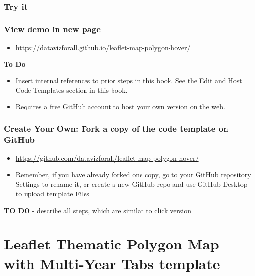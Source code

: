 \documentclass[
  english,
]{book}
\providecommand{\tightlist}{%
  \setlength{\itemsep}{0pt}\setlength{\parskip}{0pt}}
\begin{document}
\hypertarget{try-it-12}{%
\subsubsection*{Try it}\label{try-it-12}}

\hypertarget{view-demo-in-new-page-1}{%
\subsubsection*{View demo in new page}\label{view-demo-in-new-page-1}}

\begin{itemize}
\tightlist
\item
  \url{https://datavizforall.github.io/leaflet-map-polygon-hover/}
\end{itemize}

\textbf{To Do}

\begin{itemize}
\tightlist
\item
  Insert internal references to prior steps in this book. See the Edit and Host Code Templates section in this book.
\item
  Requires a free GitHub account to host your own version on the web.
\end{itemize}

\hypertarget{create-your-own-fork-a-copy-of-the-code-template-on-github-1}{%
\subsubsection*{Create Your Own: Fork a copy of the code template on GitHub}\label{create-your-own-fork-a-copy-of-the-code-template-on-github-1}}

\begin{itemize}
\tightlist
\item
  \url{https://github.com/datavizforall/leaflet-map-polygon-hover/}
\item
  Remember, if you have already forked one copy, go to your GitHub repository Settings to rename it, or create a new GitHub repo and use GitHub Desktop to upload template Files
\end{itemize}

\textbf{TO DO}
- describe all steps, which are similar to click version

\hypertarget{leaflet-polygon-map-multi-year-tabs}{%
\section{Leaflet Thematic Polygon Map with Multi-Year Tabs template}\label{leaflet-polygon-map-multi-year-tabs}}
\end{document}
